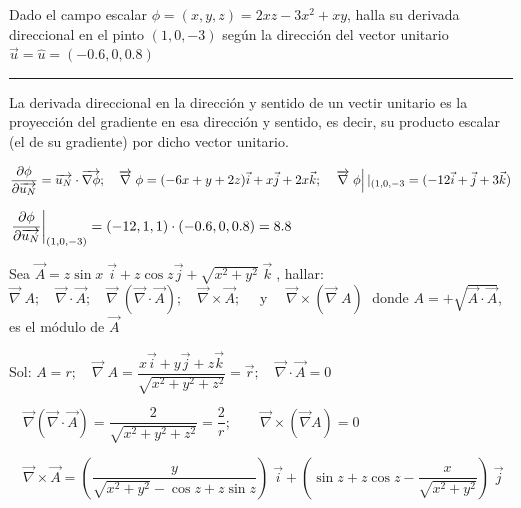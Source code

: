 \vspace{3mm}
\begin{miejercicio}

Dado el campo escalar $\phi=(x,y,z)=2xz-3x^2+xy$, halla su derivada direccional en el pinto $(1,0,-3)$ según la dirección del vector unitario $\vec u = \widehat { u } =(-0.6,0,0.8)$ 

\rule{200pt}{0.1pt}

La derivada direccional en la dirección y sentido de un vectir unitario es la proyección del gradiente en esa dirección y sentido, es decir, su producto escalar (el de su gradiente) por dicho vector unitario.

$\dfrac {\partial \phi}{\partial \overrightarrow {u_N}} = \overrightarrow {u_N} \cdot \overrightarrow {\nabla \phi}; \quad \overrightarrow \nabla \; \phi = (-6x+y+2z) \vec i + x \vec j + 2x \vec k; \quad \eval {\overrightarrow \nabla \; \phi}|_{(1,0,-3}=(-12\vec i + \vec j + 3\vec k)$

$\eval {\dfrac { \partial \phi }{ \partial \overrightarrow {u_N} } }_{(1,0,-3)} = (-12,1,1)\cdot(-0.6,0,0.8)=8.8$
\end{miejercicio}	
\vspace{3mm}

\begin{mipropuesto}

Sea $\overrightarrow A = z \sin x \; \vec i + z \cos z \vec j + \sqrt{x^2+y^2}\; \vec k\; $, hallar:  	$\overrightarrow \nabla \; A; \quad   \overrightarrow {\nabla} \cdot \overrightarrow A; \quad \overrightarrow \nabla \; (\overrightarrow {\nabla} \cdot \overrightarrow A); \quad \overrightarrow {\nabla} \times \overrightarrow A; \quad \text { y } \quad \overrightarrow {\nabla} \times ( \overrightarrow \nabla \; A )\; $  donde $A =+\sqrt{\overrightarrow A \cdot \overrightarrow A}$, es el módulo de $\overrightarrow A$
\end{mipropuesto}

\textcolor{gris}{Sol: $A=r; \quad \overrightarrow \nabla \; A =\dfrac {x\vec i + y \vec j + z \vec k}{\sqrt{x^2+y^2+z^2}}=\vec r; \quad \overrightarrow \nabla \cdot \overrightarrow A= 0 $}

\textcolor{gris}{$\quad \overrightarrow \nabla (\overrightarrow \nabla \cdot \overrightarrow A)=\dfrac {2}{\sqrt{x^2+y^2+z^2}}=\dfrac 2 r ;\qquad \overrightarrow \nabla \times (\overrightarrow \nabla A ) =0$}


\textcolor{gris}{$ \quad \overrightarrow \nabla \times \overrightarrow A= \left( \dfrac {y}{\sqrt{x^2+y^2}-\cos z + z \sin z} \right)\; \vec i + \left (\sin z + z \cos z - \dfrac {x}{\sqrt{x^2+y^2}}  \right)\; \vec j$}


